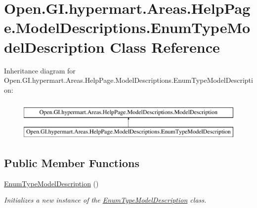 \hypertarget{class_open_1_1_g_i_1_1hypermart_1_1_areas_1_1_help_page_1_1_model_descriptions_1_1_enum_type_model_description}{}\section{Open.\+G\+I.\+hypermart.\+Areas.\+Help\+Page.\+Model\+Descriptions.\+Enum\+Type\+Model\+Description Class Reference}
\label{class_open_1_1_g_i_1_1hypermart_1_1_areas_1_1_help_page_1_1_model_descriptions_1_1_enum_type_model_description}


 


Inheritance diagram for Open.\+G\+I.\+hypermart.\+Areas.\+Help\+Page.\+Model\+Descriptions.\+Enum\+Type\+Model\+Description\+:\begin{figure}[H]
\begin{center}
\leavevmode
\includegraphics[height=2.000000cm]{class_open_1_1_g_i_1_1hypermart_1_1_areas_1_1_help_page_1_1_model_descriptions_1_1_enum_type_model_description}
\end{center}
\end{figure}
\subsection*{Public Member Functions}
\begin{DoxyCompactItemize}
\item 
\hyperlink{class_open_1_1_g_i_1_1hypermart_1_1_areas_1_1_help_page_1_1_model_descriptions_1_1_enum_type_model_description_a77a337dadd9fdcee12869c7385bf51dc}{Enum\+Type\+Model\+Description} ()
\begin{DoxyCompactList}\small\item\em Initializes a new instance of the \hyperlink{class_open_1_1_g_i_1_1hypermart_1_1_areas_1_1_help_page_1_1_model_descriptions_1_1_enum_type_model_description}{Enum\+Type\+Model\+Description} class. \end{DoxyCompactList}\end{DoxyCompactItemize}
